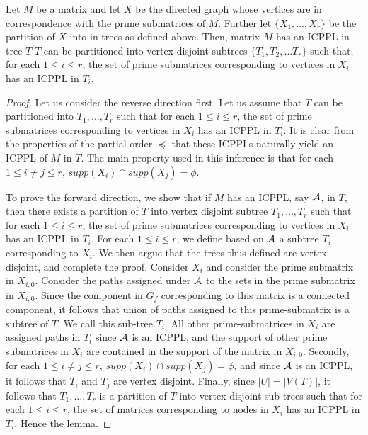 \begin{lemma}
  \label{lem:subicppa}
  Let $M$ be a matrix and let $X$ be the directed graph whose vertices
  are in correspondence with the prime submatrices of $M$.  Further
  let $\{X_1,\ldots,X_r\}$ be the partition of $X$ into in-trees as
  defined above.  Then, matrix $M$ has an ICPPL in tree $T$ \iff $T$
  can be partitioned into vertex disjoint subtrees $\{T_1, T_2, \dots
  T_r\}$ such that, for each $1 \leq i \leq r$, the set of prime
  submatrices corresponding to vertices in $X_i$ has an ICPPL in
  $T_i$.
\end{lemma}
\begin{proof}\thesisspacing
  Let us consider the reverse direction first.  Let us assume that $T$
  can be partitioned into $T_1, \ldots, T_r$ such that for each $1
  \leq i \leq r $, the set of prime submatrices corresponding to
  vertices in $X_i$ has an ICPPL in $T_i$.  It is clear from the
  properties of the partial order $\preccurlyeq$ that these ICPPLs
  naturally yield an ICPPL of $M$ in $T$.  The main property used in
  this inference is that for each $1 \leq i \neq j \leq r$, $supp(X_i)
  \cap supp(X_j) = \phi$.

\noindent
To prove the forward direction, we show that if $M$ has an ICPPL, say
${\cal A}$, in $T$, then there exists a partition of $T$ into vertex
disjoint subtree $T_1, \ldots, T_r$ such that for each $1 \leq i \leq
r$, the set of prime submatrices corresponding to vertices in $X_i$
has an ICPPL in $T_i$.  For each $1 \leq i \leq r$, we define based on
${\cal A}$ a subtree $T_i$ corresponding to $X_i$.  We then argue that the
trees thus defined are vertex disjoint, and complete the proof.
Consider $X_i$ and consider the prime submatrix in $X_{i,0}$.
Consider the paths assigned under ${\cal A}$ to the sets in the prime
submatrix in $X_{i,0}$.  Since the component in $G_f$ corresponding
to this matrix is a connected component, it follows that union of
paths assigned to this prime-submatrix is a subtree of $T$.  We call
this sub-tree $T_i$.  All other prime-submatrices in $X_i$ are
assigned paths in $T_i$ since ${\cal A}$ is an ICPPL, and the support of
other prime submatrices in $X_i$ are contained in the support of the
matrix in $X_{i,0}$.  Secondly, for each $1 \leq i \neq j \leq r$,
$supp(X_i) \cap supp(X_j) = \phi$, and since ${\cal A}$ is an ICPPL, it
follows that $T_i$ and $T_j$ are vertex disjoint.  Finally, since $|U|
= |V(T)|$, it follows that $T_1, \ldots, T_r$ is a partition of $T$
into vertex disjoint sub-trees such that for each $1 \leq i \leq r$,
the set of matrices corresponding to nodes in $X_i$ has an ICPPL in
$T_i$.  Hence the lemma.
\end{proof}
